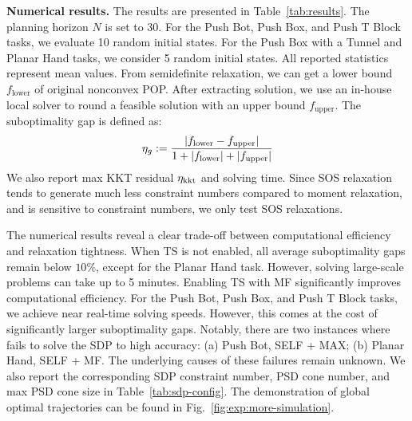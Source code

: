 \textbf{Numerical results.} The results are presented in Table~\ref{tab:results}. The planning horizon $N$ is set to $30$. For the Push Bot, Push Box, and Push T Block tasks, we evaluate 10 random initial states. For the Push Box with a Tunnel and Planar Hand tasks, we consider 5 random initial states. All reported statistics represent mean values.  
From semidefinite relaxation, we can get a lower bound $f_{\text{lower}}$ of original nonconvex POP. After extracting solution, we use an in-house local solver to round a feasible solution with an upper bound $f_{\text{upper}}$. The suboptimality gap is defined as:
\begin{align}
    \label{eq:exp:suuboptimality-gap}
    \eta_g := \frac{
        \left|f_{\text{lower}} - f_{\text{upper}}\right|
    }{
        1 + \left|f_{\text{lower}}\right| + \left|f_{\text{upper}}\right|
    }
\end{align}
We also report max KKT residual $\eta_{\text{kkt}}$ and \MOSEK solving time.   
Since SOS relaxation tends to generate much less constraint numbers compared to moment relaxation, and \MOSEK is sensitive to constraint numbers, we only test SOS relaxations. 

The numerical results reveal a clear trade-off between computational efficiency and relaxation tightness. When TS is not enabled, all average suboptimality gaps remain below $10\%$, except for the Planar Hand task. However, solving large-scale problems can take up to 5 minutes.  
Enabling TS with MF significantly improves computational efficiency. For the Push Bot, Push Box, and Push T Block tasks, we achieve near real-time solving speeds. However, this comes at the cost of significantly larger suboptimality gaps.  
Notably, there are two instances where \MOSEK fails to solve the SDP to high accuracy: (a) Push Bot, SELF + MAX; (b) Planar Hand, SELF + MF. The underlying causes of these failures remain unknown. We also report the corresponding SDP constraint number, PSD cone number, and max PSD cone size in Table~\ref{tab:sdp-config}. The demonstration of global optimal trajectories can be found in Fig.~\ref{fig:exp:more-simulation}.



